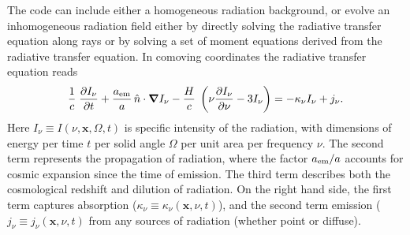 The code can include either a homogeneous radiation background, 
or evolve an inhomogeneous
radiation field either by directly solving the radiative transfer
equation along rays or by solving a set of moment equations derived
from the radiative transfer equation. In comoving coordinates
\citep[e.g.,][]{Gnedin97} the radiative transfer equation reads
%
\begin{equation}
  \label{eq:rteqn}
  \frac{1}{c} \; \frac{\partial I_\nu}{\partial t} + 
  \frac{a_{\rm em}}{a} \, \hat{n} \cdot \grad I_\nu -
  \frac{H}{c} \; \left( \nu \frac{\partial I_\nu}{\partial \nu} -
  3 I_\nu \right) = -\kappa_\nu I_\nu + j_\nu .
\end{equation}
%
Here $I_\nu \equiv I(\nu, \mathbf{x}, \Omega, t)$ is specific
intensity of the radiation, with dimensions of energy per time $t$ per
solid angle $\Omega$ per unit area per frequency $\nu$.  The second
term represents the propagation of radiation, where the factor $a_{\rm
  em}/a$ accounts for cosmic expansion since the time of emission.
The third term describes both the cosmological redshift and dilution
of radiation.  On the right hand side, the first term captures
absorption ($\kappa_\nu \equiv \kappa_\nu(\mathbf{x},\nu,t)$), and the
second term emission ($j_\nu \equiv j_\nu(\mathbf{x},\nu,t)$ from any
sources of radiation (whether point or diffuse).


